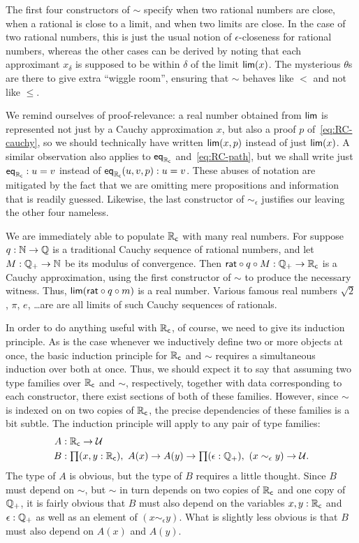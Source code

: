 The first four constructors of $\sim$ specify when two rational numbers are close, when a rational is close to a limit, and when two limits are close.
In the case of two rational numbers, this is just the usual notion of $\epsilon$-closeness for rational numbers, whereas the other cases can be derived by noting that each approximant $x_\delta$ is supposed to be within $\delta$ of the limit $\mathsf{lim}(x)$.
The mysterious $\theta$s are there to give extra ``wiggle room'', ensuring that $\sim$ behaves like $<$ and not like $\leq$.

We remind ourselves of proof-relevance: a real number obtained from $\mathsf{lim}$ is represented not
just by a Cauchy approximation $x$, but also a proof $p$ of~\eqref{eq:RC-cauchy}, so we
should technically have written $\mathsf{lim}(x,p)$ instead of just $\mathsf{lim}(x)$.
A similar observation also applies to $\mathsf{eq}_{\mathbb{R}_\mathsf{c}}$ and~\eqref{eq:RC-path}, but we shall write just
$\mathsf{eq}_{\mathbb{R}_\mathsf{c}} : u = v$ instead of $\mathsf{eq}_{\mathbb{R}_\mathsf{c}}(u, v, p) : u = v$. These abuses of notation are
mitigated by the fact that we are omitting mere propositions and information that is
readily guessed.
Likewise, the last constructor of $\mathord{\sim_\epsilon}$ justifies our leaving the other four nameless.

We are immediately able to populate $\mathbb{R}_\mathsf{c}$ with many real numbers. For suppose $q : \mathbb{N} \to
\mathbb{Q}$ is a traditional Cauchy sequence of rational numbers, and let $M : \mathbb{Q}_{+} \to \mathbb{N}$ be its
modulus of convergence. Then $\mathsf{rat} \circ q \circ M : \mathbb{Q}_{+} \to \mathbb{R}_\mathsf{c}$ is a Cauchy
approximation, using the first constructor of $\sim$ to produce the necessary witness.
Thus, $\mathsf{lim}(\mathsf{rat} \circ q \circ m)$ is a real number. Various famous
real numbers $\sqrt{2}$, $\pi$, $e$, \dots are are all limits of such Cauchy sequences of
rationals.

\medskip

In order to do anything useful with $\mathbb{R}_\mathsf{c}$, of course, we need to give its induction principle.
As is the case whenever we inductively define two or more objects at once, the basic induction principle for $\mathbb{R}_\mathsf{c}$ and $\mathord\sim$ requires a simultaneous induction over both at once.
Thus, we should expect it to say that assuming two type families over $\mathbb{R}_\mathsf{c}$ and $\sim$, respectively, together with data corresponding to each constructor, there exist sections of both of these families.
However, since $\sim$ is indexed on on two copies of $\mathbb{R}_\mathsf{c}$, the precise dependencies of these families is a bit subtle.
The induction principle will apply to any pair of type families:
\begin{align*}
A&:\RC\to\type\\
B&:\prd{x,y:\RC} A(x) \to A(y) \to \prd{\epsilon:\Qp} (x\sim_\epsilon y) \to \type.
\end{align*}
The type of $A$ is obvious, but the type of $B$ requires a little thought.
Since $B$ must depend on $\sim$, but $\sim$ in turn depends on two copies of $\mathbb{R}_\mathsf{c}$ and one copy of $\mathbb{Q}_{+}$, it is fairly obvious that $B$ must also depend on the variables $x,y:\mathbb{R}_\mathsf{c}$ and $\epsilon:\mathbb{Q}_{+}$ as well as an element of $(x\sim_\epsilon y)$.
What is slightly less obvious is that $B$ must also depend on $A(x)$ and $A(y)$.

